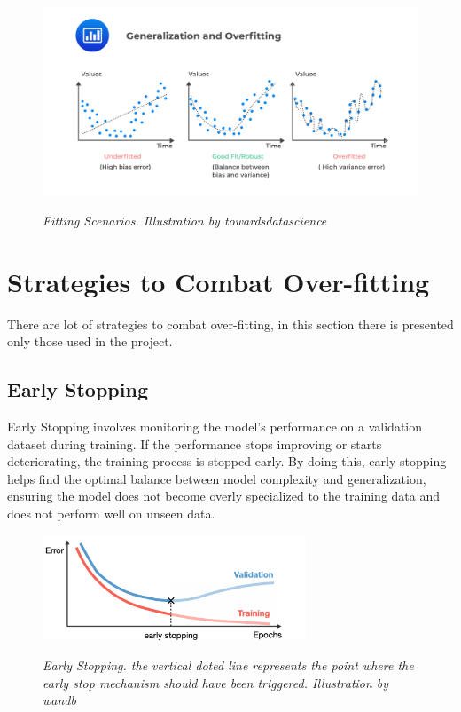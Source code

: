 \begin{figure}[H]
  \centering
  \begin{adjustbox}{width=\textwidth, trim={0cm 1.25cm 0cm 2.25cm}, clip}
  \includegraphics[width=\textwidth]{imatges/preliminaries/fit-scenes.jpg}
  \end{adjustbox}
  \caption[Fitting Scenarios]{\textit{Fitting Scenarios. Illustration by towardsdatascience}}
  {\label{fig:underfitting-overfitting-goodfitting}}
\end{figure}

\section{Strategies to Combat Over-fitting}

There are lot of strategies to combat over-fitting, in this section there is
presented only those used in the project. \\

\subsection{Early Stopping}

Early Stopping involves monitoring the model's performance on a validation
dataset during training. If the performance stops improving or starts
deteriorating, the training process is stopped early. By doing this, early
stopping helps find the optimal balance between model complexity and
generalization, ensuring the model does not become overly specialized to the
training data and does not perform well on unseen data. \\

\begin{figure}[H]
  \centering
  \includegraphics[width=0.7\textwidth]{imatges/preliminaries/early-stop.png}
  \caption[Early Stopping]{\textit{Early Stopping. the vertical doted line
  represents the point where the early stop mechanism should have been
  triggered. Illustration by wandb}}
  {\label{fig:early-stop}}
\end{figure}


